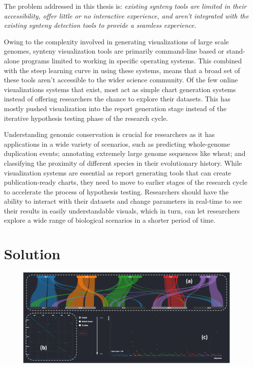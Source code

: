 The problem addressed in this thesis is: \textit{existing synteny tools are limited in their accessibility, offer little or no interactive experience, and aren't integrated with the existing synteny detection tools to provide a seamless experience.}

Owing to the complexity involved in generating visualizations of large scale genomes, synteny visualization tools are primarily command-line based or stand-alone programs limited to working in specific operating systems. This combined with the steep learning curve in using these systems, means that a broad set of these tools aren't accessible to the wider science community. Of the few online visualizations systems that exist, most act as simple chart generation systems instead of offering researchers the chance to explore their datasets. This has mostly pushed visualization into the report generation stage instead of the  iterative hypothesis testing phase of the research cycle.

Understanding genomic conservation is crucial for researchers as it has applications in a wide variety of scenarios, such as predicting whole-genome duplication events; annotating extremely large genome sequences like wheat; and classifying the proximity of different species in their evolutionary history.
While visualization systems are essential as report generating tools that can create publication-ready charts, they need to move to earlier stages of the research cycle to accelerate the process of hypothesis testing.
Researchers should have the ability to interact with their datasets and change parameters in real-time to see their results in easily understandable visuals,
which in turn, can let researchers explore a wide range of biological scenarios in a shorter period of time.

\section{Solution}

\begin{figure}
  \centering
  \includegraphics[width=.75\linewidth]{images/ch_1_dashboard.PNG}
  \label{fig:ch_1_dashboard}
\end{figure}

